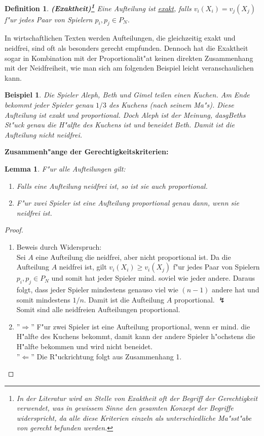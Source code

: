 \documentclass[11pt, a4paper, twoside]{article}
\newtheorem*{defi}{Definition}
\newtheorem*{bsp}{Beispiel}
\newtheorem*{lem}{Lemma}
\numberwithin{equation}{section}
\begin{document}
\begin{defi}{\textbf{(Exaktheit)\footnote{In der Literatur wird an Stelle von Exaktheit oft der Begriff der Gerechtigkeit verwendet, was in gewissem Sinne den gesamten Konzept der Begriffe widerspricht, da alle diese Kriterien einzeln als unterschiedliche Ma"sst"abe von gerecht befunden werden.}}}
\newline Eine Aufteilung ist \underline{exakt}, falls $v_i(X_i) = v_j(X_j)$ f"ur jedes Paar von Spielern $p_i, p_j \in P_N$.
\end{defi}
In wirtschaftlichen Texten werden Aufteilungen, die gleichzeitig exakt und neidfrei, sind oft als besonders gerecht empfunden. Dennoch hat die Exaktheit sogar in Kombination mit der Proportionalit"at keinen direkten Zusammenhang mit der Neidfreiheit, wie man sich am folgenden Beispiel leicht veranschaulichen kann.\\
\begin{bsp}Die Spieler Aleph, Beth und Gimel teilen einen Kuchen. Am Ende bekommt jeder Spieler genau $1/3$ des Kuchens (nach seinem Ma"s). Diese Aufteilung ist exakt und proportional. Doch Aleph ist der Meinung, dasgBeths St"uck genau die H"alfte des Kuchens ist und beneidet Beth. Damit ist die Aufteilung nicht neidfrei.\end{bsp}
\textbf{Zusammenh"ange der Gerechtigkeitskriterien:}
\begin{lem}
F"ur alle Aufteilungen gilt:
\begin{enumerate}
\item Falls eine Aufteilung neidfrei ist, so ist sie auch proportional.
\item F"ur zwei Spieler ist eine Aufteilung proportional genau dann, wenn sie neidfrei ist.
\end{enumerate}
\end{lem}
\begin{proof}
\begin{enumerate}
\item Beweis durch Widerspruch:\\ Sei $A$ eine Aufteilung die neidfrei, aber nicht proportional ist. Da die Aufteilung $A$ neidfrei ist, gilt $v_i(X_i) \geq v_i(X_j)$ f"ur jedes Paar von Spielern $p_i, p_j \in P_N$ und somit hat jeder Spieler mind. soviel wie jeder andere. Daraus folgt, dass jeder Spieler mindestens genauso viel wie $(n-1)$ andere hat und somit mindestens $1/n$. Damit ist die Aufteilung $A$ proportional. $\lightning$\\Somit sind alle neidfreien Aufteilungen proportional.
\item ''$\Rightarrow$'' F"ur zwei Spieler ist eine Aufteilung proportional, wenn er mind. die H"alfte des Kuchens bekommt, damit kann der andere Spieler h"ochstens die H"alfte bekommen und wird nicht beneidet.\\ ''$\Leftarrow$'' Die R"uckrichtung folgt aus Zusammenhang 1.\\
\end{enumerate}
\end{proof}
\end{document}
